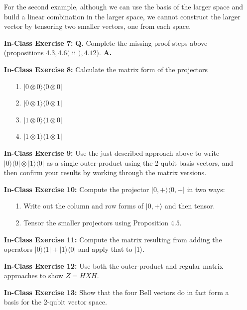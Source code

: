 \documentclass[main.tex]{subfiles}
\begin{document}
\begin{enumerate}
    For the second example, although we can use the basis of the larger space and build a linear combination in the larger space, we cannot construct the larger vector by tensoring two smaller vectors, one from each space.

\item[] \textbf{In-Class Exercise 7:} \textbf{Q.} Complete the missing proof steps above (propositions $4.3,4.6($ ii $), 4.12)$. \textbf{A.}

\item[] \textbf{In-Class Exercise 8:} Calculate the matrix form of the projectors
    \begin{enumerate}
        \item[1.] $|0 \otimes 0\rangle\langle 0 \otimes 0|$
        \item[2.] $|0 \otimes 1\rangle\langle 0 \otimes 1|$
        \item[3.] $|1 \otimes 0\rangle\langle 1 \otimes 0|$
        \item[4.] $|1 \otimes 1\rangle\langle 1 \otimes 1|$
    \end{enumerate}

\item[] \textbf{In-Class Exercise 9:} Use the just-described approach above to write $|0\rangle\langle 0|\otimes| 1\rangle\langle 0|$ as a single outer-product using the 2-qubit basis vectors, and then confirm your results by working through the matrix versions.

\item[] \textbf{In-Class Exercise 10:} Compute the projector $|0,+\rangle\langle 0,+|$ in two ways:
    \begin{enumerate}
        \item[1.] Write out the column and row forms of $|0,+\rangle$ and then tensor.
        \item[2.]  Tensor the smaller projectors using Proposition $4.5$.
    \end{enumerate}

\item[] \textbf{In-Class Exercise 11:} Compute the matrix resulting from adding the operators $|0\rangle\langle 1|+| 1\rangle\langle 0|$ and apply that to $|1\rangle .$

\item[] \textbf{In-Class Exercise 12:} Use both the outer-product and regular matrix approaches to show $Z=H X H$.

\item[] \textbf{In-Class Exercise 13:}  Show that the four Bell vectors do in fact form a basis for the 2-qubit vector space.

\end{enumerate}
\end{document}

